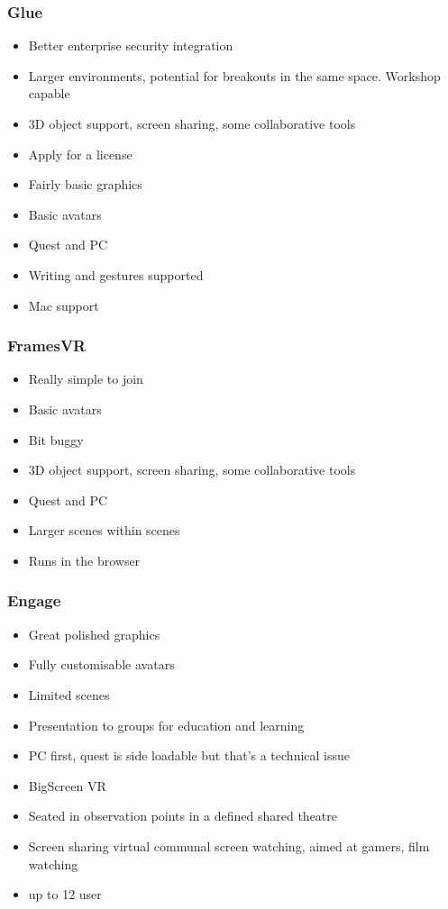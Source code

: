 \subsubsection{Glue}
\begin{itemize}
\item Better enterprise security integration
\item Larger environments, potential for breakouts in the same space. Workshop capable
\item 3D object support, screen sharing, some collaborative tools
\item Apply for a license
\item Fairly basic graphics
\item Basic avatars
\item Quest and PC
\item Writing and gestures supported
\item Mac support
\end{itemize}
\subsubsection{FramesVR}
\begin{itemize}
\item Really simple to join
\item Basic avatars
\item Bit buggy
\item 3D object support, screen sharing, some collaborative tools
\item Quest and PC
\item Larger scenes within scenes
\item Runs in the browser
\end{itemize}
\subsubsection{Engage}
\begin{itemize}
\item Great polished graphics
\item Fully customisable avatars
\item Limited scenes
\item Presentation to groups for education and learning
\item PC first, quest is side loadable but that's a technical issue
\item BigScreen VR
\item Seated in observation points in a defined shared theatre
\item Screen sharing virtual communal screen watching, aimed at gamers, film watching
\item up to 12 user
\end{itemize}
